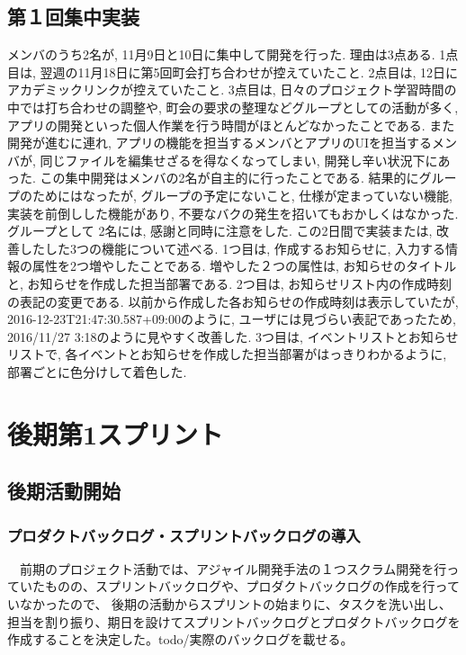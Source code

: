 \subsection{第１回集中実装}
メンバのうち2名が, 11月9日と10日に集中して開発を行った. 理由は3点ある. 1点目は, 翌週の11月18日に第5回町会打ち合わせが控えていたこと. 2点目は, 12日にアカデミックリンクが控えていたこと.
3点目は, 日々のプロジェクト学習時間の中では打ち合わせの調整や, 町会の要求の整理などグループとしての活動が多く, アプリの開発といった個人作業を行う時間がほとんどなかったことである.
また開発が進むに連れ, アプリの機能を担当するメンバとアプリのUIを担当するメンバが, 同じファイルを編集せざるを得なくなってしまい, 開発し辛い状況下にあった.
この集中開発はメンバの2名が自主的に行ったことである. 結果的にグループのためにはなったが, グループの予定にないこと, 仕様が定まっていない機能, 実装を前倒しした機能があり,
不要なバクの発生を招いてもおかしくはなかった. グループとして 2名には, 感謝と同時に注意をした. この2日間で実装または, 改善したした3つの機能について述べる.
1つ目は, 作成するお知らせに, 入力する情報の属性を2つ増やしたことである. 増やした２つの属性は, お知らせのタイトルと, お知らせを作成した担当部署である.
2つ目は, お知らせリスト内の作成時刻の表記の変更である. 以前から作成した各お知らせの作成時刻は表示していたが, 2016-12-23T21:47:30.587+09:00のように, ユーザには見づらい表記であったため,
 2016/11/27 3:18のように見やすく改善した. 3つ目は, イベントリストとお知らせリストで, 各イベントとお知らせを作成した担当部署がはっきりわかるように, 部署ごとに色分けして着色した.

\section{後期第1スプリント}
\subsection{後期活動開始}
\subsubsection{プロダクトバックログ・スプリントバックログの導入}
　前期のプロジェクト活動では、アジャイル開発手法の１つスクラム開発を行っていたものの、スプリントバックログや、プロダクトバックログの作成を行っていなかったので、
後期の活動からスプリントの始まりに、タスクを洗い出し、担当を割り振り、期日を設けてスプリントバックログとプロダクトバックログを作成することを決定した。todo/実際のバックログを載せる。

